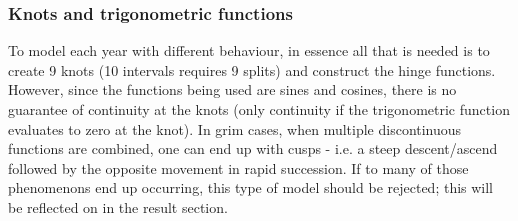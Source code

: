 \subsubsection{Knots and trigonometric functions}
To model each year with different behaviour, in essence all that is needed is to create 9 knots (10 intervals requires 9 splits) and construct the hinge functions.
However, since the functions being used are sines and cosines, there is no guarantee of continuity at the knots (only continuity if the trigonometric function evaluates to zero at the knot).
 In grim cases, when multiple discontinuous functions are combined, one can end up with cusps - i.e. a steep descent/ascend followed by the opposite movement in rapid succession.
If to many of those phenomenons end up occurring, this type of model should be rejected; this will be reflected on in the result section. 
